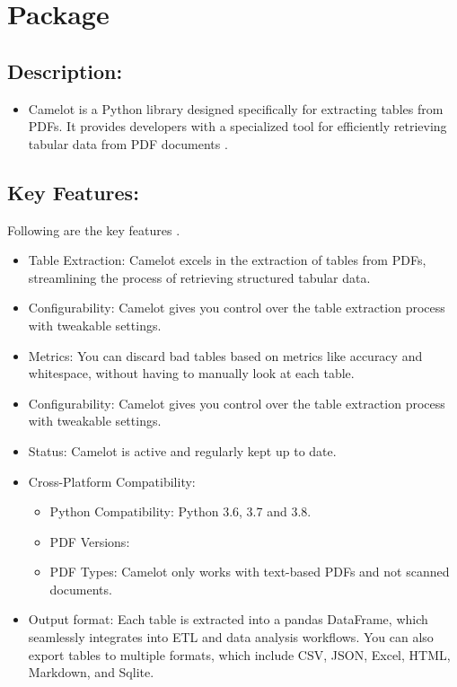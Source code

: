 \chapter{Package }%

\section{Description:}
\begin{itemize}
    \item Camelot is a Python library designed specifically for extracting tables from PDFs. It provides developers with a specialized tool for efficiently retrieving tabular data from PDF documents \cite{camelot:2023}.
\end{itemize}

\section{Key Features:}
Following are the key features \cite{camelot:2023}.
\begin{itemize}
    \item Table Extraction: Camelot excels in the extraction of tables from PDFs, streamlining the process of retrieving structured tabular data.
    \item Configurability: Camelot gives you control over the table extraction process with tweakable settings.
    \item Metrics: You can discard bad tables based on metrics like accuracy and whitespace, without having to manually look at each table.
    \item Configurability: Camelot gives you control over the table extraction process with tweakable settings.
    \item Status: Camelot is active and regularly kept up to date. 
    \item Cross-Platform Compatibility: 
    \begin{itemize}
    \item Python Compatibility: Python 3.6, 3.7 and 3.8.  
    \item PDF Versions: 
    \item PDF Types: Camelot only works with text-based PDFs and not scanned documents. 
    \end{itemize}
    \item Output format: Each table is extracted into a pandas DataFrame, which seamlessly integrates into ETL and data analysis workflows. You can also export tables to multiple formats, which include CSV, JSON, Excel, HTML, Markdown, and Sqlite.
\end{itemize}

